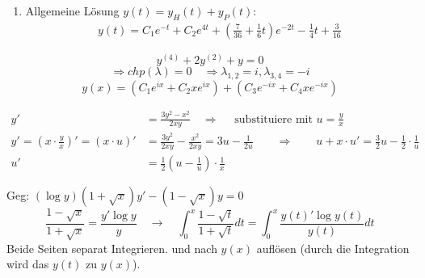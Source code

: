 \documentclass[a4paper]{article}
\begin{document}
\begin{multicols}{2}
\begin{fmerke}
\begin{enumerate}
				\item Allgemeine Lösung $y(t) = y_H(t) + y_P(t)$:\\
					\vspace{-3mm}
						\begin{align*}y(t) = C_1 e^{-t} + C_2 e^{4t} 
							+ \left(\frac{7}{36} + \frac{1}{6}t\right) e^{-2t} -\frac{1}{4} t + \frac{3}{16}\end{align*}
					\vspace{-6mm}
			\end{enumerate}
		\end{fmerke}
				
		\begin{fmerke}
			\vspace{1mm}
				$$y^{(4)}+ 2 y^{(2)}+y=0$$
				$$\Rightarrow chp(\lambda)=0 \quad \Rightarrow \lambda_{1,2}=i, \lambda_{3,4}=-i$$
				$$y(x) = (C_1 e^{ix} + C_2 xe^{ix}) + (C_3 e^{-ix} + C_4 xe^{-ix})$$
		\end{fmerke}	
	\end{multicols}
	\begin{fmerke}
		\begin{align*}
			y' &= \frac{3y^2-x^2}{2xy} \quad \Longrightarrow \quad \text{ substituiere mit $u= \frac{y}{x}$}\\
			y' = \left( x \cdot \frac{y}{x} \right)' = (x \cdot u)' &= \frac{3y^2}{2xy}- \frac{x^2}{2xy} = 3u - \frac{1}{2u} \qquad \Longrightarrow \qquad u+x \cdot u' = \frac{3}{2}u - \frac{1}{2}\cdot\frac{1}{u} \\
			u' &= \frac{1}{2} \left( u - \frac{1}{u}\right)\cdot \frac{1}{x}
		\end{align*}

	\end{fmerke}
	\begin{fmerke}
			Geg: $(\log y)(1 + \sqrt{x})y' - (1 - \sqrt{x}) y = 0$
			\hspace{-4mm}
			$$\frac{1 - \sqrt{x}}{1 + \sqrt{x}} = \frac{y' \log y}{y} \quad \rightarrow \quad \int_0^x \frac{1 - \sqrt{t}}{1 + \sqrt{t}} dt = \int_0^x \frac{y(t)' \log y(t)}{y(t)} dt$$
			Beide Seiten separat Integrieren. und nach $y(x)$ auflösen (durch die Integration wird das $y(t)$ zu $y(x)$).
	\end{fmerke}
\end{document}
